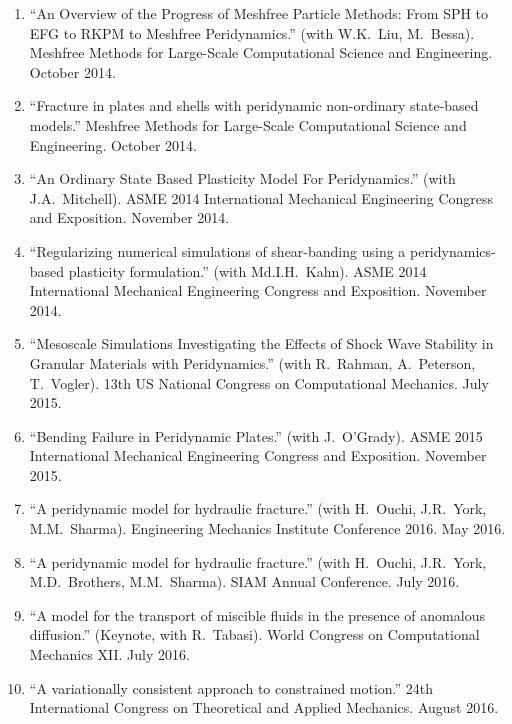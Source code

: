 \begin{enumerate}[resume]
    \item ``An Overview of the Progress of Meshfree Particle Methods: From SPH to EFG to RKPM to Meshfree Peridynamics.'' (with W.K.~Liu, M.~Bessa). Meshfree Methods for Large-Scale Computational Science and Engineering. October 2014.
    \item ``Fracture in plates and shells with peridynamic non-ordinary state-based models.''  Meshfree Methods for Large-Scale Computational Science and Engineering. October 2014.
    \item ``An Ordinary State Based Plasticity Model For Peridynamics.'' (with J.A.~Mitchell). ASME 2014 International Mechanical Engineering Congress and Exposition. November 2014.
    \item ``Regularizing numerical simulations of shear-banding using a peridynamics-based plasticity formulation.'' (with Md.I.H.~Kahn). ASME 2014 International Mechanical Engineering Congress and Exposition. November 2014.
    \item ``Mesoscale Simulations Investigating the Effects of Shock Wave Stability in Granular Materials with Peridynamics.'' (with R.~Rahman, A.~Peterson, T.~Vogler). 13th US National Congress on Computational Mechanics. July 2015.
    \item ``Bending Failure in Peridynamic Plates.'' (with J.~O'Grady). ASME 2015 International Mechanical Engineering Congress and Exposition. November 2015.
    \item ``A peridynamic model for hydraulic fracture.'' (with H.\ Ouchi, J.R.\ York, M.M.\ Sharma). Engineering Mechanics Institute Conference 2016. May 2016.
    \item ``A peridynamic model for hydraulic fracture.'' (with H.\ Ouchi, J.R.\ York, M.D.\ Brothers, M.M.\ Sharma). SIAM Annual Conference.  July 2016.
    \item ``A model for the transport of miscible fluids in the presence of anomalous diffusion.'' (Keynote, with R.\ Tabasi). World Congress on Computational Mechanics XII.  July 2016.
    \item ``A variationally consistent approach to constrained motion.'' 24th International Congress on Theoretical and Applied Mechanics.  August 2016.
\end{enumerate}
\else
\ifdefined\ispdf
